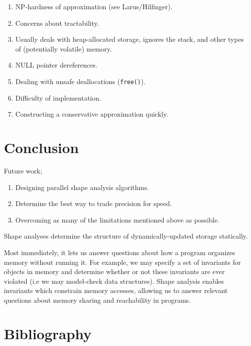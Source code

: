 \documentclass{article}
\begin{document}
\begin{enumerate}[1.]
    \item NP-hardness of approximation (see Larus/Hilfinger).
    \item Concerns about tractability.
    \item Usually deals with heap-allocated storage, ignores the stack, and
        other types of (potentially volatile) memory.
    \item NULL pointer dereferences.
    \item Dealing with unsafe deallocations (\texttt{free()}).
    \item Difficulty of implementation.
    \item Constructing a conservative approximation quickly.
\end{enumerate}

\section{Conclusion}

Future work;
\begin{enumerate}[1.]
    \item Designing parallel shape analysis algorithms.
    \item Determine the best way to trade precision for speed.
    \item Overcoming as many of the limitations mentioned above as possible.
\end{enumerate}

Shape analyses determine the structure of dynamically-updated storage
statically.

Most immediately, it lets us answer questions about how a program organizes
memory without running it. For example, we may specify a set of invariants
for objects in memory and determine whether or not these invariants are ever
violated (i.e we may model-check data structures). Shape analysis enables
invariants which constrain memory accesses, allowing us to answer relevant
questions about memory sharing and reachability in programs.

\section{Bibliography}
\end{document}

